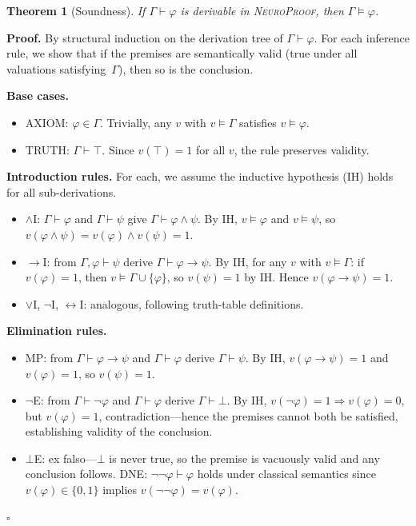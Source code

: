 \documentclass[conference]{IEEEtran}
\newtheorem{theorem}{Theorem}[section]
\newenvironment{proof}[1][Proof]{\textbf{#1.} }{\hfill$\square$}
\newcommand{\entails}{\vDash}
\newcommand{\proves}{\vdash}
\newcommand{\dland}{\mathbin{\wedge}}
\newcommand{\dlnot}{\neg}
\newcommand{\dlimp}{\mathbin{\to}}
\newcommand{\dlbot}{\bot}
\newcommand{\dltop}{\top}
\newcommand{\NP}{\textsc{NeuroProof}}
\begin{document}
\begin{theorem}[Soundness]
  \label{thm:soundness}
  If $\Gamma \proves \varphi$ is derivable in \NP{}, then
  $\Gamma \entails \varphi$.
\end{theorem}
\begin{proof}
  By structural induction on the derivation tree of $\Gamma \proves \varphi$.
  For each inference rule, we show that if the premises are semantically
  valid (true under all valuations satisfying~$\Gamma$), then so is the
  conclusion.

  \medskip
  \noindent\textbf{Base cases.}
  \begin{itemize}
    \item \textsc{AXIOM}: $\varphi \in \Gamma$.  Trivially, any
      $v$ with $v \entails \Gamma$ satisfies $v \entails \varphi$.
    \item \textsc{TRUTH}: $\Gamma \proves \dltop$.  Since
      $v(\dltop) = 1$ for all $v$, the rule preserves validity.
  \end{itemize}

  \noindent\textbf{Introduction rules.}
  For each, we assume the inductive hypothesis (IH) holds for all
  sub-derivations.
  \begin{itemize}
    \item $\wedge$\textsc{I}: $\Gamma \proves \varphi$ and
      $\Gamma \proves \psi$ give $\Gamma \proves \varphi \dland \psi$.
      By IH, $v \entails \varphi$ and $v \entails \psi$, so
      $v(\varphi \dland \psi) = v(\varphi) \wedge v(\psi) = 1$.
    \item $\to$\textsc{I}: from $\Gamma, \varphi \proves \psi$ derive
      $\Gamma \proves \varphi \dlimp \psi$.  By IH, for any $v$
      with $v \entails \Gamma$: if $v(\varphi) = 1$, then
      $v \entails \Gamma \cup \{\varphi\}$, so $v(\psi) = 1$ by IH.
      Hence $v(\varphi \dlimp \psi) = 1$.
    \item $\vee$\textsc{I}, $\dlnot$\textsc{I}, $\leftrightarrow$\textsc{I}:
      analogous, following truth-table definitions.
  \end{itemize}

  \noindent\textbf{Elimination rules.}
  \begin{itemize}
    \item \textsc{MP}: from $\Gamma \proves \varphi \dlimp \psi$ and
      $\Gamma \proves \varphi$ derive $\Gamma \proves \psi$.  By IH,
      $v(\varphi \dlimp \psi) = 1$ and $v(\varphi) = 1$, so
      $v(\psi) = 1$.
    \item $\dlnot$\textsc{E}: from $\Gamma \proves \dlnot\varphi$ and
      $\Gamma \proves \varphi$ derive $\Gamma \proves \dlbot$.
      By IH, $v(\dlnot\varphi) = 1 \Rightarrow v(\varphi) = 0$, but
      $v(\varphi) = 1$, contradiction---hence the premises cannot both
      be satisfied, establishing validity of the conclusion.
    \item $\dlbot$\textsc{E}: ex falso---$\dlbot$ is never true, so
      the premise is vacuously valid and any conclusion follows.
    \textsc{DNE}: $\dlnot\dlnot\varphi \proves \varphi$ holds under
      classical semantics since $v(\varphi) \in \{0,1\}$ implies
      $v(\dlnot\dlnot\varphi) = v(\varphi)$.
  \end{itemize}


\end{proof}
\end{document}
